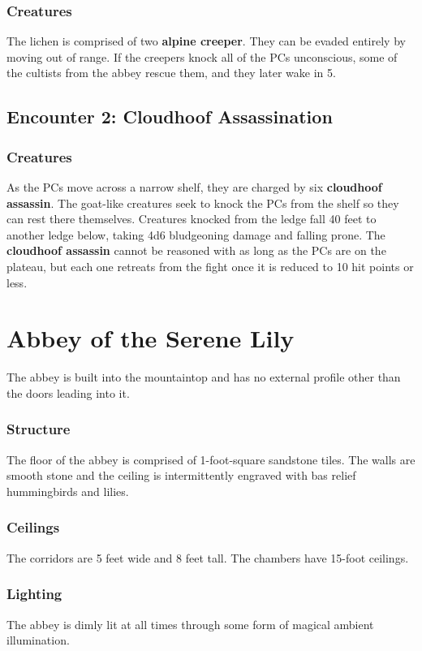 \documentclass[10pt,a4paper,twoside,bg=print,twocolumn,openany,nodeprecatedcode]{dndbook}
\begin{document}
\subsubsection{Creatures}
The lichen is comprised of two \textbf{alpine creeper}. They can be evaded entirely by moving out of range. If the creepers knock all of the PCs unconscious, some of the cultists from the abbey rescue them, and they later wake in 5.

\subsection{Encounter 2: Cloudhoof Assassination}
\subsubsection{Creatures}
As the PCs move across a narrow shelf, they are charged by six \textbf{cloudhoof assassin}. The goat-like creatures seek to knock the PCs from the shelf so they can rest there themselves. Creatures knocked from the ledge fall 40 feet to another ledge below, taking 4d6 bludgeoning damage and falling prone. The \textbf{cloudhoof assassin} cannot be reasoned with as long as the PCs are on the plateau, but each one retreats from the fight once it is reduced to 10 hit points or less.

\section{Abbey of the Serene Lily}
The abbey is built into the mountaintop and has no external profile other than the doors leading into it.

\subsubsection{Structure}
The floor of the abbey is comprised of 1-foot-square sandstone tiles. The walls are smooth stone and the ceiling is intermittently engraved with bas relief hummingbirds and lilies.

\subsubsection{Ceilings}
The corridors are 5 feet wide and 8 feet tall. The chambers have 15-foot ceilings.

\subsubsection{Lighting}
The abbey is dimly lit at all times through some form of magical ambient illumination.
\end{document}
